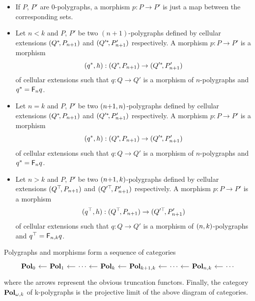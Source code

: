\begin{itemize}
\item If $P$, $P'$ are $0$-polygraphs, a morphism $p:P\to P'$ is
  just a map between the corresponding sets.
\item Let $n< k$ and $P$, $P'$ be two $(n{+}1)$-polygraphs defined by
  cellular extensions $(Q^*\!,P_{n+1})$ and  $(Q'^*\!,P'_{n+1})$ respectively. A morphism $p:P\to P'$ is a
  morphism
  \[(q^*,h):(Q^*\!,P_{n+1})\to (Q'^*\!,P'_{n+1})\]
  of cellular extensions such that $q:Q\to Q'$ is a morphism of
  $n$-polygraphs and $q^*=\mathsf{F}_{n} q$.
\item Let $n= k$ and $P$, $P'$ be two $(n{+}1,n)$-polygraphs defined by
  cellular extensions $(Q^*\!,P_{n+1})$ and  $(Q'^*\!,P'_{n+1})$ respectively. A morphism $p:P\to P'$ is a
  morphism
  \[(q^*,h):(Q^*\!,P_{n+1})\to (Q'^*\!,P'_{n+1})\]
  of cellular extensions such that $q:Q\to Q'$ is a morphism of
  $n$-polygraphs and $q^*=\mathsf{F}_{n} q$.  
  \item Let $n> k$ and $P$, $P'$ be two $(n{+}1,k)$-polygraphs defined by
  cellular extensions $(Q^\top\!,P_{n+1})$ and  $(Q'^\top\!,P'_{n+1})$ respectively. A morphism $p:P\to P'$ is a
  morphism
  \[(q^\top,h):(Q^\top\!,P_{n+1})\to (Q'^\top\!,P'_{n+1})\]
  of cellular extensions such that $q:Q\to Q'$ is a morphism of
  $(n,k)$-polygraphs and $q^\top=\mathsf{F}_{n,k} q$.
\end{itemize}
Polygraphs and morphisms form a  sequence of categories
  \[
    \begin{tikzcd}[column sep=small]
    \nPol 0 &\nPol 1\ar[l]& \cdots\ar[l] & \nPol k\ar[l] & \npPol{k+1}k \ar[l]& \cdots\ar[l] &
    \npPol nk\ar[l] & \cdots\ar[l]  
    \end{tikzcd}
    \]
  where the arrows represent the obvious truncation functors. Finally,
  the category $\mathbf{Pol}_{\omega,k}$ of \ook k-polygraphs is the projective limit of the
  above diagram of categories.
